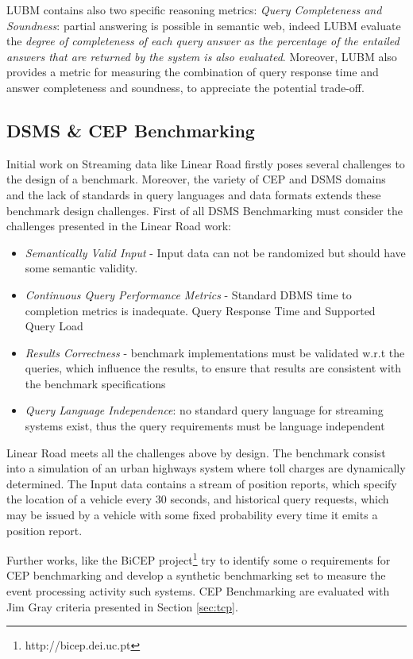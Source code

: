 LUBM contains also two specific reasoning metrics: \textit{Query Completeness and Soundness}: partial answering is possible in semantic web, indeed LUBM evaluate the \textit{degree of completeness of each query answer as the percentage of the entailed answers that are returned by the system is also evaluated}. Moreover, LUBM also provides a metric for measuring the combination of  query response time and answer completeness and soundness, to  appreciate the potential trade-off.

\subsection{DSMS \& CEP Benchmarking}\label{sec:linear-road}

Initial work on Streaming data like Linear Road \cite{arasu2004linear} firstly poses  several challenges to the design of a benchmark.  Moreover, the variety of CEP and DSMS domains and the lack of standards in query languages and data formats extends these benchmark design challenges. First of all DSMS Benchmarking must consider the challenges presented in the Linear Road work:
\begin{itemize}
\item  \textit{Semantically Valid Input} -  Input data can not be randomized but should have some semantic validity.
\item  \textit{Continuous Query Performance Metrics} - Standard DBMS time to completion metrics is inadequate. Query Response Time and Supported Query Load 
\item  \textit{Results Correctness} - benchmark implementations must be validated w.r.t the queries, which influence the results, to ensure that results are consistent with the benchmark specifications 
\item  \textit{Query Language Independence}: no standard query language for streaming systems exist, thus the query requirements must be language independent
\end{itemize}

Linear Road meets all the challenges above by design. The benchmark consist into a simulation of  an urban highways system where toll charges are dynamically determined. The Input data contains a stream of position reports, which specify the location of a vehicle every 30 seconds, and historical query requests, which may be issued by a vehicle with some fixed probability every time it emits a position report.

Further works, like the BiCEP project\footnote{http://bicep.dei.uc.pt} try to identify some o requirements for CEP benchmarking and develop a synthetic benchmarking set to measure the event processing activity such systems. CEP Benchmarking are evaluated with Jim Gray criteria presented in Section \ref{sec:tcp}. 


